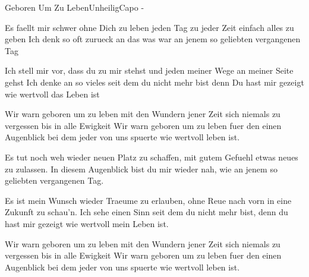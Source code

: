 \begin{song}{Geboren Um Zu Leben}{Unheilig}{Capo -}


Es faellt mir schwer ohne Dich zu leben
jeden Tag zu jeder Zeit einfach alles zu geben
Ich denk so oft zurueck an das was war 
an jenem so geliebten vergangenen Tag 

Ich stell mir vor, dass du zu mir stehst
und jeden meiner Wege an meiner Seite gehst
Ich denke an so vieles seit dem du nicht mehr bist 
denn Du hast mir gezeigt wie wertvoll das Leben ist

Wir warn geboren um zu leben  mit den Wundern jener Zeit
sich niemals zu vergessen bis in alle Ewigkeit
Wir warn geboren um zu leben fuer den einen Augenblick 
bei dem jeder von uns spuerte wie wertvoll leben ist. 

Es tut noch weh wieder neuen Platz zu schaffen, 
mit gutem Gefuehl etwas neues zu zulassen. 
In diesem Augenblick bist du mir wieder nah, 
wie an jenem so geliebten vergangenen Tag.







Es ist mein Wunsch wieder Traeume zu erlauben, 
ohne Reue nach vorn in eine Zukunft zu schau'n. 
Ich sehe einen Sinn seit dem du nicht mehr bist, 
denn du hast mir gezeigt wie wertvoll mein Leben ist.

Wir warn geboren um zu leben  mit den Wundern jener Zeit
sich niemals zu vergessen bis in alle Ewigkeit
Wir warn geboren um zu leben fuer den einen Augenblick 
bei dem jeder von uns spuerte wie wertvoll leben ist. 


\end{song}
